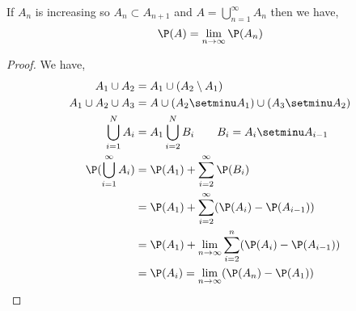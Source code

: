 \begin{theorem}
    If $A_n$ is increasing so $A_n \subset A_{n + 1}$ and  $A = \bigcup_{n = 1}^{\infty} A_n$ then we have, 
    $$ \P(A) = \lim_{n \to \infty} \P(A_n) $$ 

\end{theorem}
\begin{proof}
    We have, 
    \begin{align*}
    A_1 \cup A_2 &= A_1 \cup (A_2 \setminus A_1)\\
    A_1 \cup A_2 \cup A_3 &= A \cup (A_2 \setminu A_1) \cup (A_3 \setminu A_2)\\
    \bigcup_{i = 1}^{N} A_i  &= A_1  \bigcup_{i = 2}^{N} B_i \qquad B_i = A_i \setminu A_{i - 1}\\
    \P(\bigcup_{i = 1}^{\infty} A_i)  &= \P(A_1) +\sum_{i=2}^{\infty}  \P(B_i)\\
  &= \P(A_1) +\sum_{i=2}^{\infty}  (\P(A_i) - \P(A_{i - 1}))\\
  &= \P(A_1) + \lim_{n \to \infty} \sum_{i=2}^{n}  (\P(A_i) - \P(A_{i - 1}))\\
  &= \P(A_i) = \lim_{n \to \infty} (\P(A_n) - \P(A_1))
    \end{align*}

\end{proof}
